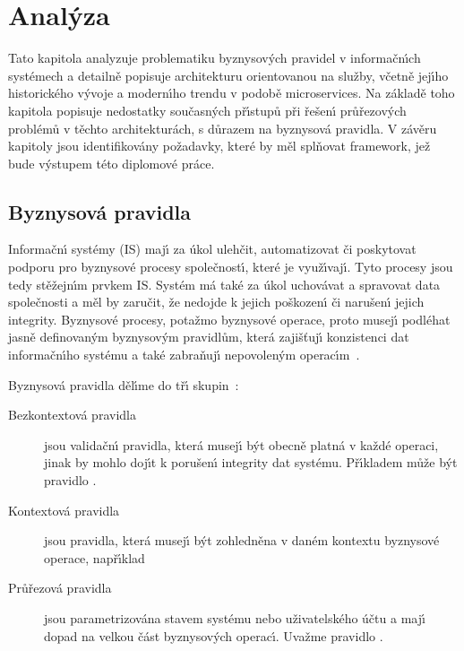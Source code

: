 
\chapter{Anal\'yza}\label{ch:analyza}

Tato kapitola analyzuje problematiku byznysov\'ych pravidel v informačn\'{\i}ch systémech
a detailně popisuje architekturu orientovanou na služby, včetně jej\'{\i}ho historického
v\'yvoje a modern\'{\i}ho trendu v podobě microservices. Na základě toho kapitola popisuje nedostatky
současn\'ych př\'{\i}stupů při řešen\'{\i} průřezov\'ych problémů v těchto architekturách, s důrazem na byznysová pravidla.
V závěru kapitoly jsou identifikovány požadavky, které by měl splňovat framework,
jež bude v\'ystupem této diplomové práce.

\section{Byznysová pravidla}\label{sec:business-rules}

Informačn\'{\i} systémy (\gls{IS}) maj\'{\i} za úkol ulehčit, automatizovat či poskytovat podporu pro
byznysové procesy společnost\'{\i}, které je využ\'{\i}vaj\'{\i}. Tyto procesy jsou tedy stěžejn\'{\i}m
prvkem \gls{IS}. Systém má také za úkol uchovávat a spravovat data společnosti
a měl by zaručit, že nedojde k jejich poškozen\'{\i} či narušen\'{\i} jejich integrity.
Byznysové procesy, potažmo byznysové operace, proto musej\'{\i}
podléhat jasně definovan\'ym byznysov\'ym pravidlům, která zajišťuj\'{\i} konzistenci dat informačn\'{\i}ho
systému a také zabraňuj\'{\i} nepovolen\'ym operac\'{\i}m~\cite{cemus2015automated}.

Byznysová pravidla děl\'{\i}me do tř\'{\i} skupin~\cite{cemus2014aspect}:
\begin{description}
    \item [Bezkontextová pravidla] jsou validačn\'{\i} pravidla, která musej\'{\i} b\'yt obecně platná
    v každé operaci, jinak by mohlo doj\'{\i}t k porušen\'{\i} integrity dat systému. Př\'{\i}kladem může
    b\'yt pravidlo .
    \item [Kontextová pravidla] jsou pravidla, která musej\'{\i} b\'yt zohledněna v daném kontextu
    byznysové operace, např\'{\i}klad 
    \item [Průřezová pravidla] jsou parametrizována stavem systému nebo uživatelského účtu a maj\'{\i}
    dopad na velkou část byznysov\'ych operac\'{\i}. Uvažme pravidlo .
\end{description}


